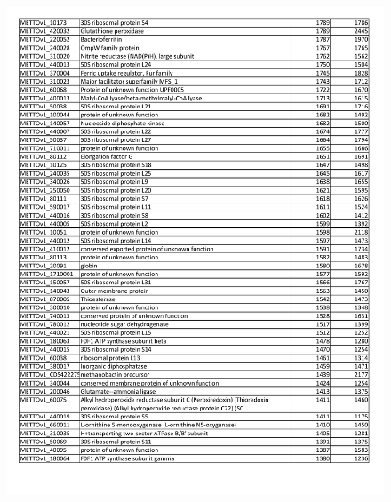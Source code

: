\begin{figure}[H]
\centering
    \includegraphics[width=1.0\textwidth]{./tex/chapter1/figures/supplemental/TableS2c.pdf}
\end{figure}
